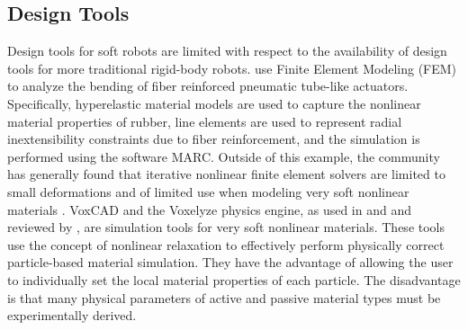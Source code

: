 \subsection{Design Tools}
\label{subsec:RW Design Tools}
Design tools for soft robots are limited with respect to the availability of design tools for more traditional rigid-body robots.
\citet{suzumori2007bending} use Finite Element Modeling (FEM) to analyze the bending of fiber reinforced pneumatic tube-like actuators.
Specifically, hyperelastic material models are used to capture the nonlinear material properties of rubber, line elements are used to represent radial inextensibility constraints due to fiber reinforcement, and the simulation is performed using the software MARC.
Outside of this example, the community has generally found that iterative nonlinear finite element solvers are limited to small deformations and of limited use when modeling very soft nonlinear materials \citep{lipson2014challenges}.
VoxCAD and the Voxelyze physics engine, as used in \citet{cheney2013unshackling} and \citet{lehman2011evolving} and reviewed by \citet{lipson2014challenges}, are simulation tools for very soft nonlinear materials.
These tools use the concept of nonlinear relaxation to effectively perform physically correct particle-based material simulation.
They have the advantage of allowing the user to individually set the local material properties of each particle.
The disadvantage is that many physical parameters of active and passive material types must be experimentally derived.

